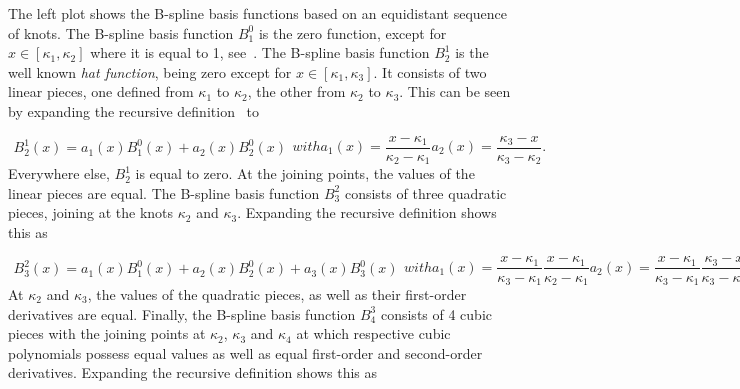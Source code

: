 The left plot shows the B-spline basis functions based on an equidistant sequence of knots. The B-spline basis function $B_1^0$ is the zero function, except for $x \in [\kappa_1, \kappa_2]$ where it is equal to 1, see~. The B-spline basis function $B_2^1$ is the well known \emph{hat function}, being zero except for $x \in [\kappa_1, \kappa_3]$. It consists of two linear pieces, one defined from $\kappa_1$ to $\kappa_2$, the other from $\kappa_2$ to $\kappa_3$. This can be seen by expanding the recursive definition~ to

\begin{subequations} \label{eq:Bspline-BF_21}
	\begin{align}
		B_2^1(x) = a_1(x) B_1^0(x) + a_2(x) B_2^0(x)
	\end{align}
	with
	\begin{equation}
		a_1(x) = \frac{x - \kappa_1}{\kappa_2 - \kappa_1} 
	\end{equation}
	\begin{equation}
		a_2(x) = \frac{\kappa_3 - x}{\kappa_3 - \kappa_2}. 
	\end{equation}
\end{subequations}
%
Everywhere else, $B_2^1$ is equal to zero. At the joining points, the values of the linear pieces are equal. The B-spline basis function $B_3^2$ consists of three quadratic pieces, joining at the knots $\kappa_2$ and $\kappa_3$. Expanding the recursive definition shows this as

\begin{subequations}
	\begin{align}
		B_3^2(x) = a_1(x) B_1^0(x) + a_2(x) B_2^0(x) + a_3(x) B_3^0(x)
	\end{align}
	with
	\begin{equation}
		a_1(x) = \frac{x-\kappa_1}{\kappa_3 - \kappa_1} \frac{x - \kappa_1}{\kappa_2 - \kappa_1}
	\end{equation}
	\begin{equation}
		a_2(x) = \frac{x - \kappa_1}{\kappa_3 - \kappa_1} \frac{\kappa_3 - x}{\kappa_3 - \kappa_2} + \frac{\kappa_4 - x}{\kappa_4 - \kappa_2} \frac{x - \kappa_2}{\kappa_3 - \kappa_2}
	\end{equation}
	\begin{equation}
		a_3(x) = \frac{\kappa_4 - x}{\kappa_4 - \kappa_2} \frac{\kappa_4 - x}{\kappa_4 - \kappa_3}.	
	\end{equation}
\end{subequations}
%
At $\kappa_2$ and $\kappa_3$, the values of the quadratic pieces, as well as their first-order derivatives are equal. Finally, the B-spline basis function $B_4^3$ consists of 4 cubic pieces with the joining points at $\kappa_2$, $\kappa_3$ and $\kappa_4$ at which respective cubic polynomials possess equal values as well as equal first-order and second-order derivatives. Expanding the recursive definition shows this as

